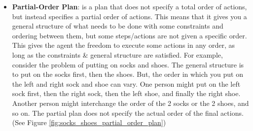 \begin{itemize}
  \item \label{def:partial_order_plan}
        \textbf{Partial-Order Plan}: is a plan that does not specify a total order of actions, but instead specifies a partial order of actions. This means that it gives you a general structure of what needs to be done with some constraints and ordering between them, but some steps/actions are not given a specific order. This gives the agent the freedom to execute some actions in any order, as long as the constraints \& general structure are satisfied. For example, consider the problem of putting on socks and shoes. The general structure is to put on the socks first, then the shoes. But, the order in which you put on the left and right sock and shoe can vary. One person might put on the left sock first, then the right sock, then the left shoe, and finally the right shoe. Another person might interchange the order of the 2 socks or the 2 shoes, and so on. The partial plan does not specify the actual order of the final actions. (See Figure \ref{fig:socks_shoes_partial_order_plan})

        \begin{figure}[ht]
          \centering
\end{figure}
\end{itemize}
